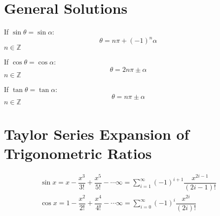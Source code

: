 \section{General Solutions}
If $\sin \theta=\sin \alpha$:
\begin{equation}
	\theta=n\pi+(-1)^n\alpha
\end{equation}
$n\in\mathbb{Z}$

If $\cos \theta=\cos \alpha$:
\begin{equation}
	\theta=2n\pi\pm\alpha
\end{equation}
$n\in\mathbb{Z}$

If $\tan \theta=\tan \alpha$:
\begin{equation}
	\theta=n\pi\pm\alpha
\end{equation}
$n\in\mathbb{Z}$


\section{Taylor Series Expansion of Trigonometric Ratios}
\begin{align}
	\sin x=x-\dfrac{x^3}{3!}+\dfrac{x^5}{5!}-\cdots\infty=\sum_{i=1}^\infty (-1)^{i+1}\dfrac{x^{2i-1}}{(2i-1)!}\\
	\cos x=1-\dfrac{x^2}{2!}+\dfrac{x^4}{4!}-\cdots\infty=\sum_{i=0}^\infty (-1)^i\dfrac{x^{2i}}{(2i)!}
\end{align}
